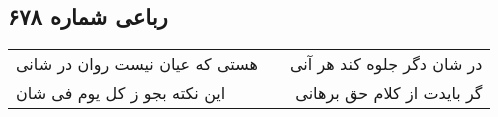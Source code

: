\begin{center}
\section*{رباعی شماره ۶۷۸}
\label{sec:sh678}
\begin{longtable}{l p{0.5cm} r}
هستی که عیان نیست روان در شانی
&&
در شان دگر جلوه کند هر آنی
\\
این نکته بجو ز کل یوم فی شان
&&
گر بایدت از کلام حق برهانی
\\
\end{longtable}
\end{center}
